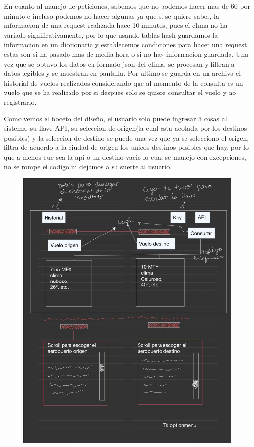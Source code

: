\documentclass[12pt]{article}
\begin{document}
En cuanto al manejo de peticiones, sabemos que no podemos hacer mas de 60 por minuto e incluso podemos no hacer algunas ya que si se quiere saber, la informacion de una request realizada hace 10 minutos, pues el clima no ha variado significativamente, por lo que usando tablas hash guardamos la informacion en un diccionario y establecemos condiciones para hacer una request, estas son si ha pasado mas de media hora o si no hay informacion guardada. Una vez que se obtuvo los datos en formato json del clima, se procesan y filtran a datos legibles y se muestran en pantalla. Por ultimo se guarda en un archivo el historial de vuelos realizados considerando que al momento de la consulta es un vuelo que se ha realizado por si despues solo se quiere consultar el vuelo y no registrarlo.

Como vemos el boceto del diseño, el usuario solo puede ingresar 3 cosas al sistema, su llave API, su seleccion de origen(la cual esta acotada por los destinos posibles) y la seleccion de destino se puede una vez que ya se selecciono el origen, filtra de acuerdo a la ciudad de origen los unicos destinos posibles que hay, por lo que a menos que sea la api o un destino vacio lo cual se manejo con excepciones, no se rompe el codigo ni dejamos a su suerte al usuario.
\begin{figure}[h!]
  \centering
  \includegraphics[scale=0.3]{figures/boceto}
  \caption{\label{fig:label} }
\end{figure}
\newpage
\end{document}
